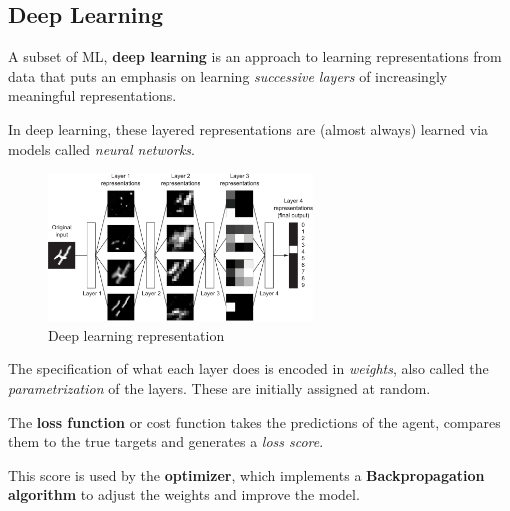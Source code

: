\subsection{Deep Learning}

A subset of ML, \textbf{deep learning} is an approach to learning representations from data that puts an emphasis on learning \textit{successive layers} of increasingly meaningful representations.

In deep learning, these layered representations are (almost always) learned via models called \textit{neural networks}.

\begin{figure}[h]
    \centering
    \includegraphics[width=7cm]{dl}
    \caption{Deep learning representation}
    \label{fig:dl}
\end{figure}

The specification of what each layer does is encoded in \textit{weights}, also called the \textit{parametrization} of the layers. These are initially assigned at random.

The \textbf{loss function} or cost function takes the predictions of the agent, compares them to the true targets and generates a \textit{loss score}.

This score is used by the \textbf{optimizer}, which implements a \textbf{Backpropagation algorithm} to adjust the weights and improve the model.



